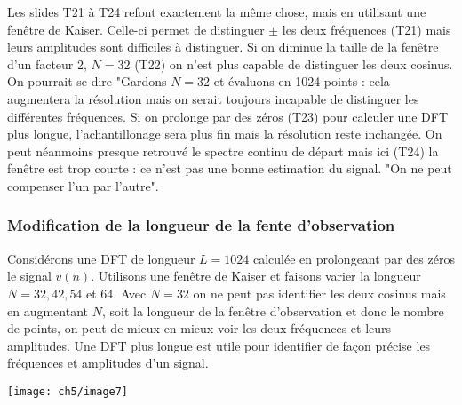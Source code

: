 			Les slides T21 à T24 refont exactement la même chose, mais en utilisant une fenêtre de Kaiser. 
			Celle-ci permet de distinguer $\pm$ les deux fréquences (T21) mais leurs amplitudes sont 
			difficiles à distinguer. Si on diminue la taille de la fenêtre d'un facteur 2, $N=32$ (T22) on 
			n'est plus capable de distinguer les deux cosinus. On pourrait se dire "Gardons $N=32$ et 
			évaluons en 1024 points : cela augmentera la résolution mais on serait toujours incapable de 
			distinguer les différentes fréquences. Si on prolonge par des zéros (T23) pour calculer une 
			DFT plus longue, l'achantillonage sera plus fin mais la résolution reste inchangée.  On peut 
			néanmoins presque retrouvé le spectre continu de départ mais ici (T24) la fenêtre est trop 
			courte : ce n'est pas une bonne estimation du signal. "On ne peut compenser l'un par l'autre".
			
			
			\subsubsection{Modification de la longueur de la fente d'observation}
			Considérons une DFT de longueur $L=1024$ calculée en prolongeant par des zéros le signal 
			$v(n)$. Utilisons une fenêtre de Kaiser et faisons varier la longueur $N=32,42,54$ et 64.
			Avec $N=32$ on ne peut pas identifier les deux cosinus mais en augmentant $N$, soit la 
			longueur de la fenêtre d’observation et donc le nombre de points, on peut de mieux en mieux 
			voir les deux fréquences et leurs amplitudes. Une DFT plus longue est utile pour identifier 
			de façon précise les fréquences et amplitudes d'un signal.
	
				\begin{center}
	\texttt{[image: ch5/image7]}
	\end{center}
	
	
	
	
	
	
	
	
	
	
	
	
	
	
	
	
	
	
	
	
	
	
	
	